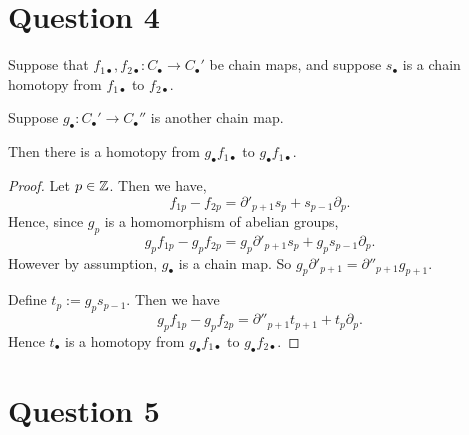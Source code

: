 \documentclass{unswmaths}
\begin{document}
\section*{Question 4}
\begin{proposition}
    Suppose that $f_{1\bullet},f_{2\bullet}:C_\bullet\rightarrow C_\bullet'$
    be chain maps, and suppose $s_\bullet$ is a chain homotopy from $f_{1\bullet}$
    to $f_{2\bullet}$. 
    
    Suppose $g_{\bullet}:C_\bullet'\rightarrow C_\bullet''$ is another chain map.
    
    Then there is a homotopy from $g_\bullet f_{1\bullet}$ to $g_\bullet f_{1\bullet}$.
\end{proposition}
\begin{proof}
    Let $p \in \mathbb{Z}$. Then we have,
    \begin{equation*}
        f_{1p}-f_{2p} = \partial'_{p+1}s_p+s_{p-1}\partial_p.
    \end{equation*}
    Hence, since $g_p$ is a homomorphism of abelian groups,
    \begin{equation*}
        g_pf_{1p}-g_pf_{2p} = g_p\partial'_{p+1}s_p+g_{p}s_{p-1}\partial_p.
    \end{equation*}
    However by assumption, $g_\bullet$ is a chain map. So $g_p \partial'_{p+1} = \partial''_{p+1} g_{p+1}$.
    
    Define $t_p := g_{p}s_{p-1}$. Then we have
    \begin{equation*}
        g_pf_{1p} - g_pf_{2p} = \partial''_{p+1}t_{p+1}+t_p\partial_p.
    \end{equation*}
    Hence $t_\bullet$ is a homotopy from $g_\bullet f_{1\bullet}$ to $g_\bullet f_{2\bullet}$.
\end{proof}

\section*{Question 5}
\end{document}
